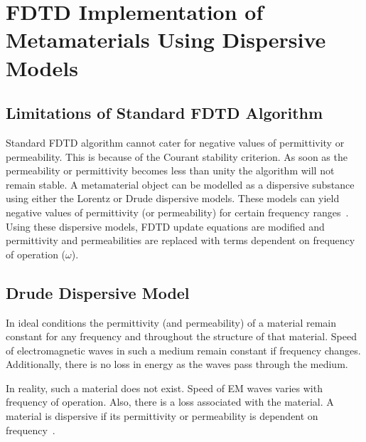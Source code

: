 \chapter{FDTD Implementation of Metamaterials Using Dispersive Models}
\section{Limitations of Standard FDTD Algorithm}
Standard FDTD algorithm cannot cater for negative values of permittivity or permeability. This is because of the Courant stability criterion. As soon as the permeability or permittivity becomes less than unity the algorithm will not remain stable. A metamaterial object can be modelled as a dispersive substance using either the Lorentz or Drude dispersive models. These models can yield negative values of permittivity (or permeability) for certain frequency ranges~\cite{NumericalFDTD-Sibel}. Using these dispersive models, FDTD update equations are modified and permittivity and permeabilities are replaced with terms dependent on frequency of operation ($\omega$).
\section{Drude Dispersive Model}
In ideal conditions the permittivity (and permeability) of a material remain constant for any frequency and throughout the structure of that material. Speed of electromagnetic waves in such a medium remain constant if frequency changes. Additionally, there is no loss in energy as the waves pass through the medium. 

In reality, such a material does not exist. Speed of EM waves varies with frequency of operation. Also, there is a loss associated with the material. A material is dispersive if its permittivity or permeability is dependent on frequency~\cite[Ch. 10]{JBSchneiderUFDTD}.

